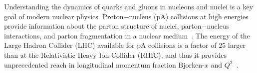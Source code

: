 Understanding the dynamics of quarks and gluons in nucleons and nuclei is a key goal of modern nuclear physics. Proton$-$nucleus (pA) collisions at high energies provide information about the parton structure of nuclei, parton$-$nucleus interactions, and parton fragmentation in a nuclear medium~\cite{Accardi:2009qv}. The energy of the Large Hadron Collider (LHC) available for pA collisions is a factor of 25 larger than at the Relativistic Heavy Ion Collider (RHIC), and thus it provides unprecedented reach in longitudinal momentum fraction Bjorken-$x$ and $Q^{2}$~\cite{Salgado:2011wc}. 

